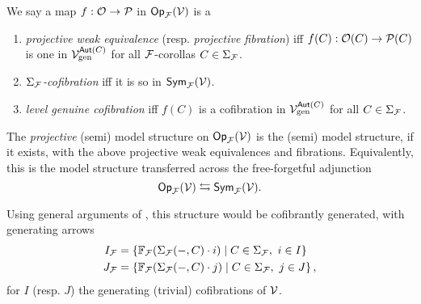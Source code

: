 \documentclass[a4paper,10pt]{article}%
\begin{document}
\begin{definition}
        We say a map $f: \mathcal{O} \to \mathcal{P}$ in $\mathsf{Op}_{\mathcal F}(\mathcal V)$ is a
        \begin{enumerate}
        \item \textit{projective weak equivalence} (resp. \textit{projective fibration})
                iff 
                $f(C): \mathcal{O}(C) \to \mathcal{P}(C)$ is one in $\mathcal V^{\mathsf{Aut}(C)}_{\text{gen}}$ for all $\mathcal F$-corollas $C\in \Sigma_{\mathcal F}$.
        \item \textit{$\Sigma_{\mathcal F}$-cofibration} iff it is so in $\mathsf{Sym}_{\mathcal F}(\mathcal V)$.
        \item \textit{level genuine cofibration} iff $f(C)$ is a cofibration in $\mathcal V^{\mathsf{Aut}(C)}_{\text{gen}}$ for all $C\in \Sigma_{\mathcal F}$.
        \end{enumerate}

        The \textit{projective} (semi) model structure on $\mathsf{Op}_{\mathcal F}(\mathcal V)$ is the (semi) model structure, if it exists, with the above projective weak equivalences and fibrations. 
        Equivalently, this is the model structure transferred across the free-forgetful adjunction
        \[
        \mathsf{Op}_{\mathcal F}(\mathcal V) \leftrightarrows \mathsf{Sym}_{\mathcal F}(\mathcal V).
        \]
\end{definition}

Using general arguments of \cite{SS00}, this structure would be cofibrantly generated, with generating arrows 
\begin{align*} 
        I_{\mathcal F} &= \left\{ \mathbb F_{\mathcal F}(\Sigma_{\mathcal F}(-,C) \cdot i) \;|\; C \in \Sigma_{\mathcal F},\ i\in I\right\}\\ 
        J_{\mathcal F} &= \left\{ \mathbb F_{\mathcal F}(\Sigma_{\mathcal F}(-,C) \cdot j) \;|\; C \in \Sigma_{\mathcal F},\ j\in J\right\}, 
\end{align*} 
for $I$ (resp. $J$) the generating (trivial) cofibrations of $\mathcal V$. 

\end{document}
